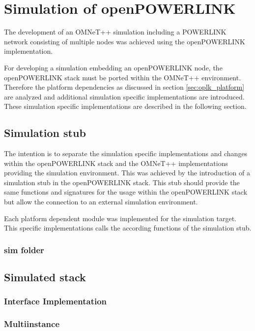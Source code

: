 \chapter{Simulation of openPOWERLINK}
\label{cha:porting}
The development of an OMNeT++ simulation including a POWERLINK network consisting of multiple nodes was achieved using the openPOWERLINK implementation.

For developing a simulation embedding an openPOWERLINK node, the openPOWERLINK stack must be ported within the OMNeT++ environment.
Therefore the platform dependencies as discussed in section \ref{sec:oplk_platform} are analyzed and additional simulation specific implementations are introduced.
These simulation specific implementations are described in the following section.

\section{Simulation stub}
\label{sec:porting_simstub}

The intention is to separate the simulation specific implementations and changes within the openPOWERLINK stack and the OMNeT++ implementations providing the simulation environment.
This was achieved by the introduction of a simulation stub in the openPOWERLINK stack.
This stub should provide the same functions and signatures for the usage within the openPOWERLINK stack but allow the connection to an external simulation environment.


Each platform dependent module was implemented for the simulation target.
This specific implementations calls the according functions of the simulation stub.


\subsection{sim folder}
\label{sec:porting_simstub_sim}

\section{Simulated stack}
\label{sec:porting_stack}

\subsection{Interface Implementation}
\label{sec:porting_stack_interface}

\subsection{Multiinstance}
\label{sec:porting_stack_multiinstance}

